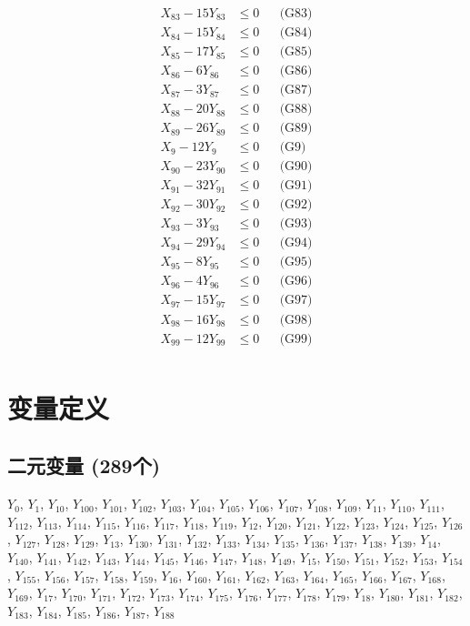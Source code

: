 \documentclass[a4paper,10pt]{article}
\begin{document}
{\begin{align}
X_{83} - 15Y_{83} &\leq 0 && \text{(G83)} \\
X_{84} - 15Y_{84} &\leq 0 && \text{(G84)} \\
X_{85} - 17Y_{85} &\leq 0 && \text{(G85)} \\
X_{86} - 6Y_{86} &\leq 0 && \text{(G86)} \\
X_{87} - 3Y_{87} &\leq 0 && \text{(G87)} \\
X_{88} - 20Y_{88} &\leq 0 && \text{(G88)} \\
X_{89} - 26Y_{89} &\leq 0 && \text{(G89)} \\
X_{9} - 12Y_{9} &\leq 0 && \text{(G9)} \\
X_{90} - 23Y_{90} &\leq 0 && \text{(G90)} \\
\allowbreak
X_{91} - 32Y_{91} &\leq 0 && \text{(G91)} \\
X_{92} - 30Y_{92} &\leq 0 && \text{(G92)} \\
X_{93} - 3Y_{93} &\leq 0 && \text{(G93)} \\
X_{94} - 29Y_{94} &\leq 0 && \text{(G94)} \\
X_{95} - 8Y_{95} &\leq 0 && \text{(G95)} \\
X_{96} - 4Y_{96} &\leq 0 && \text{(G96)} \\
X_{97} - 15Y_{97} &\leq 0 && \text{(G97)} \\
X_{98} - 16Y_{98} &\leq 0 && \text{(G98)} \\
X_{99} - 12Y_{99} &\leq 0 && \text{(G99)} \\
\end{align}}

\section{变量定义}

\subsection{二元变量 (289个)}

{\small $Y_{0}$, $Y_{1}$, $Y_{10}$, $Y_{100}$, $Y_{101}$, $Y_{102}$, $Y_{103}$, $Y_{104}$, $Y_{105}$, $Y_{106}$, $Y_{107}$, $Y_{108}$, $Y_{109}$, $Y_{11}$, $Y_{110}$, $Y_{111}$, $Y_{112}$, $Y_{113}$, $Y_{114}$, $Y_{115}$, $Y_{116}$, $Y_{117}$, $Y_{118}$, $Y_{119}$, $Y_{12}$, $Y_{120}$, $Y_{121}$, $Y_{122}$, $Y_{123}$, $Y_{124}$, $Y_{125}$, $Y_{126}$, $Y_{127}$, $Y_{128}$, $Y_{129}$, $Y_{13}$, $Y_{130}$, $Y_{131}$, $Y_{132}$, $Y_{133}$, $Y_{134}$, $Y_{135}$, $Y_{136}$, $Y_{137}$, $Y_{138}$, $Y_{139}$, $Y_{14}$, $Y_{140}$, $Y_{141}$, $Y_{142}$, $Y_{143}$, $Y_{144}$, $Y_{145}$, $Y_{146}$, $Y_{147}$, $Y_{148}$, $Y_{149}$, $Y_{15}$, $Y_{150}$, $Y_{151}$, $Y_{152}$, $Y_{153}$, $Y_{154}$, $Y_{155}$, $Y_{156}$, $Y_{157}$, $Y_{158}$, $Y_{159}$, $Y_{16}$, $Y_{160}$, $Y_{161}$, $Y_{162}$, $Y_{163}$, $Y_{164}$, $Y_{165}$, $Y_{166}$, $Y_{167}$, $Y_{168}$, $Y_{169}$, $Y_{17}$, $Y_{170}$, $Y_{171}$, $Y_{172}$, $Y_{173}$, $Y_{174}$, $Y_{175}$, $Y_{176}$, $Y_{177}$, $Y_{178}$, $Y_{179}$, $Y_{18}$, $Y_{180}$, $Y_{181}$, $Y_{182}$, $Y_{183}$, $Y_{184}$, $Y_{185}$, $Y_{186}$, $Y_{187}$, $Y_{188}$}
\end{document}
